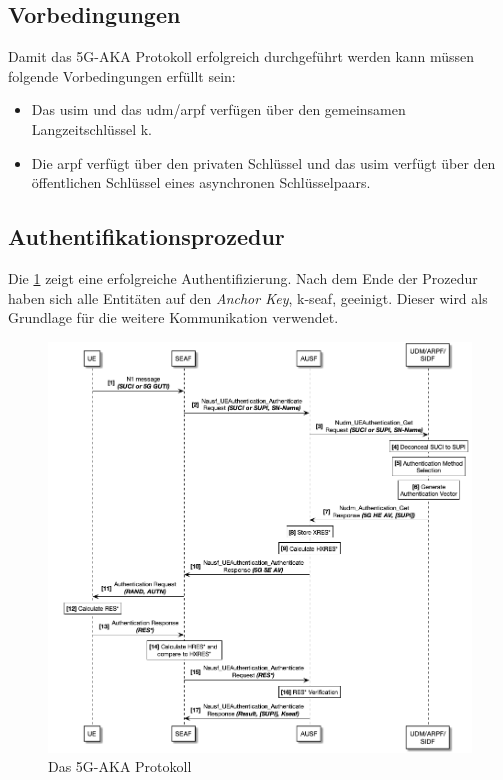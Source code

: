 \subsection{Vorbedingungen}

Damit das 5G-AKA Protokoll erfolgreich durchgeführt werden kann müssen folgende Vorbedingungen erfüllt sein:

\begin{itemize}
\item Das \gls{usim} und das \gls{udm}/\gls{arpf} verfügen über den gemeinsamen Langzeitschlüssel \gls{k}.

\item Die \gls{arpf} verfügt über den privaten Schlüssel und das \gls{usim} verfügt über den öffentlichen Schlüssel eines asynchronen Schlüsselpaars.

\end{itemize}


\subsection{Authentifikationsprozedur}

Die \cref{fig:protocol_v1} zeigt eine erfolgreiche Authentifizierung.
Nach dem Ende der Prozedur haben sich alle Entitäten auf den \textit{Anchor Key}, \gls{k-seaf}, geeinigt.
Dieser wird als Grundlage für die weitere Kommunikation verwendet.

\begin{figure}[H]
  \centering
  \includegraphics[width=\textwidth]{uml/protocol_v1.png}
  \caption{Das 5G-AKA Protokoll}
  \label{fig:protocol_v1}
\end{figure}

